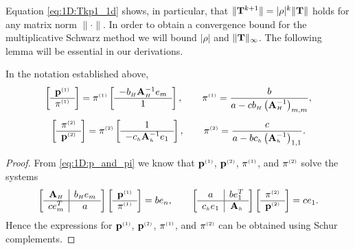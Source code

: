 Equation \eqref{eq:1D:Tkp1_1d} shows, in particular, that
$\|\mathbf{T}^{k+1}\|=|\rho|^k \|\mathbf{T}\|$ holds for any matrix norm $\|\cdot\|$.
In order to obtain a convergence bound for the multiplicative Schwarz method
we will bound $|\rho|$ and $\|\mathbf{T}\|_\infty$. The following lemma will be
essential in our derivations.

\begin{lemma} \label{lem:1D:pp_1d}
In the notation established above,
%
$$\left[\begin{array}{c}\mathbf{p}^{\scriptscriptstyle (1)} \\\hline \pi^{\scriptscriptstyle (1)}\end{array}\right]
= \pi^{\scriptscriptstyle (1)} \left[\begin{array}{c}-b_{\scriptscriptstyle H} \mathbf{A}_{\scriptscriptstyle H}^{-1}e_{m } \\
\hline 1\end{array}\right],\qquad
\pi^{\scriptscriptstyle (1)}=\frac{b }{a -c b_{\scriptscriptstyle H}  \left(\mathbf{A}_{\scriptscriptstyle H} ^{-1}\right)_{m,m}},$$
%
$$\left[\begin{array}{c} \pi^{\scriptscriptstyle (2)}\\\hline \mathbf{p}^{\scriptscriptstyle (2)}\end{array}\right]=
\pi^{\scriptscriptstyle (2)} \left[\begin{array}{c}1 \\
\hline -c_{\scriptscriptstyle h}\mathbf{A}_{\scriptscriptstyle h} ^{-1}e_1\end{array}\right],\qquad
\pi^{\scriptscriptstyle (2)}=\frac{c }{a - b c_{\scriptscriptstyle h} \left(\mathbf{A}_{\scriptscriptstyle h} ^{-1}\right)_{1,1}}.$$
%
\end{lemma}

\begin{proof}
From \eqref{eq:1D:p_and_pi} we know that $\mathbf{p}^{\scriptscriptstyle (1)}$, $\mathbf{p}^{\scriptscriptstyle (2)}$, $\pi^{\scriptscriptstyle (1)}$, and $\pi^{\scriptscriptstyle (2)}$
solve the %
systems
%
\begin{equation*}%
\left[\begin{array}{c|c}\matAH &\entryvE  e_{m }\\\hline \entryzW e_{m }^T&\entryzC  \end{array}\right]
\left[\begin{array}{c}\pOne \\\hline \piOne\end{array}\right]
=\entryzE e_n,\qquad
\left[\begin{array}{c|c}\entryzC &\entryzE  e_{1}^T\\\hline \entrywW e_{1}&  \matAh\end{array}\right]
\left[\begin{array}{c}\piTwo \\\hline \pTwo\end{array}\right]
=\entryzW e_1.
\end{equation*}
%
Hence the expressions for  $\mathbf{p}^{\scriptscriptstyle (1)}$, $\mathbf{p}^{\scriptscriptstyle (2)}$, $\pi^{\scriptscriptstyle (1)}$, and $\pi^{\scriptscriptstyle (2)}$ can be
obtained using Schur complements.
\end{proof}

